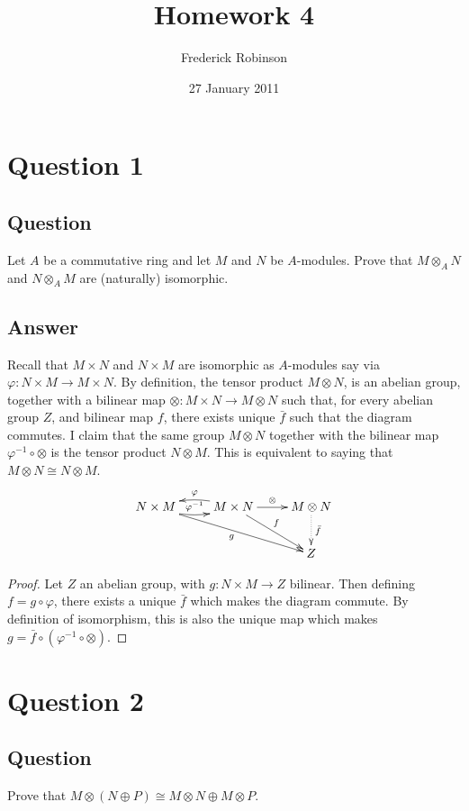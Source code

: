 \documentclass[11pt]{article}
\begin{document}



\title{Homework 4}
\author{Frederick Robinson}
\date{27 January 2011}
\maketitle




\section{Question 1}
\subsection{Question}
Let $A$ be a commutative ring and let $M$ and $N$ be $A$-modules. Prove that $M \otimes_A N$  and $N \otimes_A M$ are (naturally) isomorphic. 
\subsection{Answer}


Recall that $M \times N$ and $N \times M$ are isomorphic as $A$-modules say via $\varphi: N \times M \to M \times N$. By definition, the tensor product $M \otimes N$, is an abelian group, together with a bilinear map $\otimes: M \times N \to M \otimes N$ such that, for every abelian group $Z$, and bilinear map $f$, there exists unique $\bar{f}$ such that the diagram commutes. I claim that the same group $ M \otimes N$ together with the bilinear map $\varphi^{-1} \circ \otimes$ is the tensor product $N \otimes M$. This is equivalent to saying that $M \otimes N \cong N \otimes M$.
\[
\xymatrix{
N \times M \ar[rrd]_g \ar@/_/[r]^{\varphi^{-1}} & M \times N \ar@/_/[l]_\varphi  \ar[r]^\otimes \ar[dr]^f& M \otimes N \ar@{.>}[d]^{\bar{f}}\\
&& Z}
\]
\begin{proof}
Let $Z$ an abelian group, with $g: N \times M \to Z$ bilinear. Then defining $f = g \circ \varphi$, there exists a unique $\bar{f}$ which makes the diagram commute. By definition of isomorphism, this is also the unique map which makes $g = \bar{f} \circ (\varphi^{-1} \circ \otimes)$.
\end{proof}
\section{Question 2}
\subsection{Question}
Prove that $M \otimes (N \oplus P )  \cong M \otimes N \oplus M \otimes P$.
\end{document}

